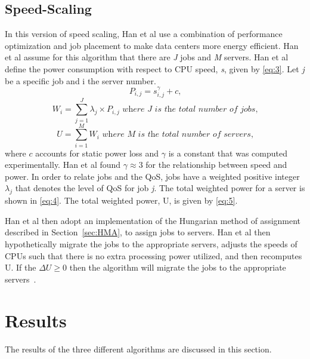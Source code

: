 \documentclass{sig-alternate}
\begin{document}
\subsection{Speed-Scaling}
\label{sec:Speed}
In this version of speed scaling, Han et al use a combination of performance optimization and job placement to make data centers more energy efficient. Han et al assume for this algorithm that there are \emph{J} jobs and \emph{M} servers. Han et al define the power consumption with respect to CPU speed, \emph{s}, given by \eqref{eq:3}. Let \emph{j} be a specific job and i the server number.
\begin{equation}
P_{i,j} = s_{i,j}^{\gamma}+ c \textit{,}\label{eq:3}
\end{equation}
\begin{equation}
W_{i} =\sum_{j=1}^J \lambda_{j} \times P_{i,j}\textit{~where J is the total number of jobs,}\label{eq:4}
\end{equation}
\begin{equation}
U =\sum_{i=1}^M W_{i} \textit{~where M is the total number of servers,}\label{eq:5}
\end{equation}
\noindent
where $c$ accounts for static power loss and $\gamma$ is a constant that was computed experimentally. Han et al found $\gamma \approx 3$ for the relationship between speed and power. In order to relate jobs and the QoS, jobs have a weighted positive integer $\lambda_j$ that denotes the level of QoS for job \emph{j}. The total weighted power for a server is shown in \eqref{eq:4}. The total weighted power, U, is given by \eqref{eq:5}.

Han et al then adopt an implementation of the Hungarian method of assignment described in Section~\ref{sec:HMA}, to assign jobs to servers. Han et al then hypothetically migrate the jobs to the appropriate servers, adjusts the speeds of CPUs such that there is no extra processing power utilized, and then recomputes U. If the $\Delta U \geq 0$ then the algorithm will migrate the jobs to the appropriate servers~\cite{Han}. 

\section{Results} 
\label{sec:results}

The results of the three different algorithms are discussed in this section.
\end{document}
